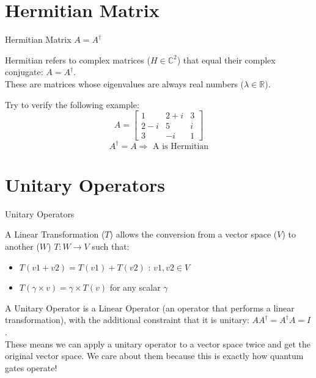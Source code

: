 \documentclass[aspectratio=43]{beamer}
\begin{document}
\section{Hermitian Matrix}
\begin{frame}{Hermitian Matrix $A = A^\dag$}
\begin{card}
    Hermitian refers to complex matrices ($H \in \mathbb{C}^2$) that equal their complex conjugate: $A = A^\dag$.\\
    These are matrices whose eigenvalues are always real numbers ($\lambda \in \mathbb{R}$).
\end{card}
\begin{card}
    Try to verify the following example:
    \begin{equation*}
        A = \begin{bmatrix}1 & 2+i & 3\\2-i & 5 & i\\3 & -i & 1\end{bmatrix}
    \end{equation*}
    \begin{equation*}
    A^\dag = A \Rightarrow\text{ A is Hermitian}
    \end{equation*}
\end{card}
\pagenumber
\end{frame}

\section{Unitary Operators}
\begin{frame}{Unitary Operators}
    \begin{card}
        A Linear Transformation ($T$) allows the conversion from a vector space ($V$) to another ($W$) $T : W \rightarrow V$ such that:
        \begin{itemize}
            \item $T(v1+v2)=T(v1)+T(v2)$ : $v1, v2 \in V$
            \item $T(\gamma \times v)=\gamma \times T(v)$ for any scalar $\gamma$
        \end{itemize}
    \end{card}
    
    \begin{cardTiny}
        A Unitary Operator is a Linear Operator (an operator that performs a linear transformation), with the additional constraint that it is unitary: $AA^\dag=A^\dag A = I$.\\
        These means we can apply a unitary operator to a vector space twice and get the original vector space. We care about them because this is exactly how quantum gates operate!
    \end{cardTiny}
\pagenumber
\end{frame}
\end{document}
